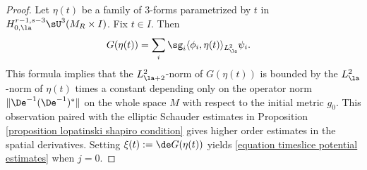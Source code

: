 \documentclass[hidelinks, 12pt, oneside, reqno]{amsart}
\begin{document}
\begin{proof}
Let $\eta(t)$ be a family of 3-forms parametrized by $t$ in $H_{0,\la}^{r-1,s-3}\sU^3(M_R \times I)$. Fix $t \in I$. Then
\begin{align*}
    G(\eta(t)) &= \sum_i \sg_i \langle \phi_i, \eta(t) \rangle_{L^2_\la} \psi_i.
\end{align*}
This formula implies that the $L^2_{\la+2}$-norm of $G(\eta(t))$ is bounded by the $L^2_{\la}$-norm of $\eta(t)$ times a constant depending only on the operator norm $\|\De^{-1}(\De^{-1})^*\|$ on the whole space $M$ with respect to the initial metric $g_0$. This observation paired with the elliptic Schauder estimates in Proposition \ref{proposition lopatinski shapiro condition} gives higher order estimates in the spatial derivatives. Setting $\xi(t) := \de G( \eta(t))$ yields \eqref{equation timeslice potential estimates} when $j = 0$.


\end{proof}
\end{document}
